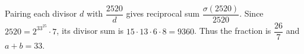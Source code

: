 Pairing each divisor $d$ with $\dfrac{2520}{d}$ gives reciprocal sum $\dfrac{\sigma(2520)}{2520}$. Since $2520=2^33^25\cdot7$, its divisor sum is $15\cdot13\cdot6\cdot8=9360$. Thus the fraction is $\dfrac{26}{7}$ and $\boxed{a+b=33}$.
